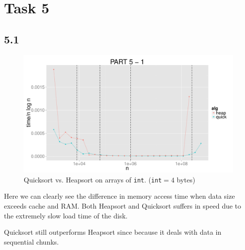 \documentclass{article}
\begin{document}
%
%
\section*{Task 5}
\subsection*{5.1}
\begin{figure}[H]
    \centering
    \includegraphics[width=
    \textwidth]{images/part5_1.pdf}
    \caption{Quicksort vs. Heapsort on arrays of \texttt{int}. 
    (\texttt{int}$= 4$ bytes)}
\end{figure}
Here we can clearly see the difference in memory access time when data size 
exceeds cache and RAM. Both Heapsort and Quicksort suffers in speed due to the 
extremely slow load time of the disk. 

Quicksort still outperforms Heapsort since because it deals with data in 
sequential chunks.    
%
%
\end{document}
